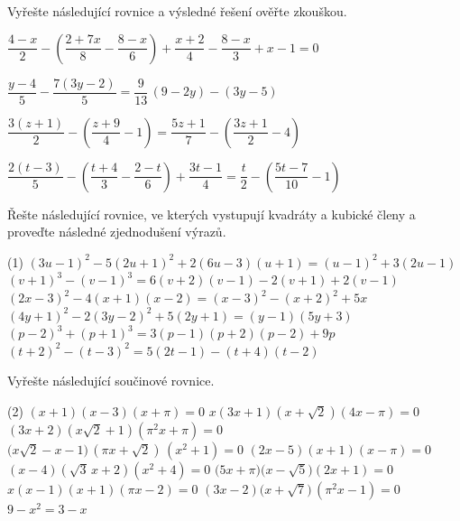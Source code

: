 \documentclass[12pt,a4paper]{article}
\begin{document}
\begin{exercise}
  Vyřešte následující rovnice a výsledné řešení ověřte zkouškou.
  \begin{tasks}
    \task \(\dfrac{4-x}{2}
              - \left(\dfrac{2+7x}{8} - \dfrac{8-x}{6}\right)
              + \dfrac{x+2}{4}
              - \dfrac{8-x}{3}
              + x - 1 = 0\)

    \task \(\dfrac{y-4}{5} - \dfrac{7(3y-2)}{5}
           = \dfrac{9}{13}\,(9-2y) - (3y-5)\)

    \task \(\dfrac{3(z+1)}{2} - \left(\dfrac{z+9}{4} - 1\right)
           = \dfrac{5z+1}{7} - \left(\dfrac{3z+1}{2} - 4\right)\)

    \task \(\dfrac{2(t-3)}{5}
           - \left(\dfrac{t+4}{3} - \dfrac{2-t}{6}\right)
           + \dfrac{3t-1}{4}
           = \dfrac{t}{2} - \left(\dfrac{5t-7}{10} - 1\right)\)
  \end{tasks}
\end{exercise}

\newpage
\begin{exercise}
  Řešte následující rovnice, ve kterých vystupují kvadráty a kubické členy a proveďte následné zjednodušení výrazů.
  \begin{tasks}(1)
    \task \((3u - 1)^2 - 5(2u + 1)^2 + 2(6u - 3)(u + 1) = (u - 1)^2 + 3(2u - 1)\)
    \task \((v + 1)^3 - (v - 1)^3 = 6(v + 2)(v - 1) - 2(v + 1) + 2(v - 1)\)
    \task \((2x - 3)^2 - 4(x + 1)(x - 2) = (x - 3)^2 - (x + 2)^2 + 5x\)
    \task \((4y + 1)^2 - 2(3y - 2)^2 + 5(2y + 1) = (y - 1)(5y + 3)\)
    \task \((p - 2)^3 + (p + 1)^3 = 3(p - 1)(p + 2)(p - 2) + 9p\)
    \task \((t + 2)^2 - (t - 3)^2 = 5(2t - 1) - (t + 4)(t - 2)\)
  \end{tasks}
\end{exercise}


\begin{exercise}
  Vyřešte následující součinové rovnice.
  \begin{tasks}(2)
    \task \((x+1)(x-3)(x+\pi)=0\)
    \task \(x(3x+1)(x+\sqrt{2})(4x-\pi)=0\)
    \task \((3x+2)(x\sqrt{2}+1)(\pi^{2}x+\pi)=0\)
    \task $\bigl(x\sqrt{2}-x-1\bigr)\,(\pi x+\sqrt{2})\,(x^{2}+1)=0$
    \task \((2x-5)(x+1)(x-\pi)=0\)
    \task \((x-4)(\sqrt{3}\,x+2)(x^{2}+4)=0\)
    \task $\bigl(5x+\pi\bigr)\bigl(x-\sqrt{5}\bigr)(2x+1)=0$
    \task \(x(x-1)(x+1)(\pi x-2)=0\)
    \task \((3x-2)\bigl(x+\sqrt{7}\bigr)\,(\pi^{2}x-1)=0\)
    \task $9 - x^2 = 3 - x$
  \end{tasks}
\end{exercise}
\end{document}
